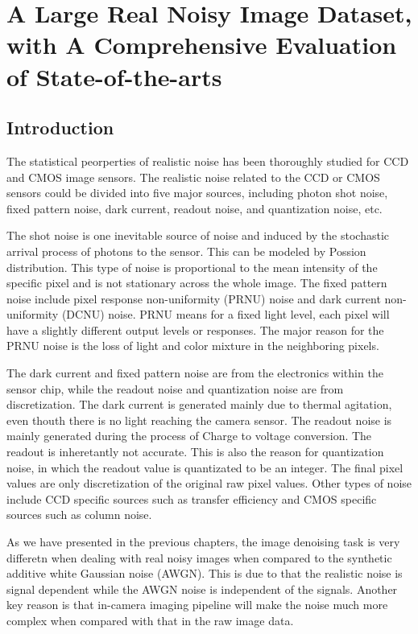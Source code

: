 %
\chapter{A Large Real Noisy Image Dataset, with A Comprehensive Evaluation of State-of-the-arts}
\label{sec:dataset}

\section{Introduction}

The statistical peorperties of realistic noise has been thoroughly studied for CCD and CMOS image sensors. The realistic noise related to the CCD or CMOS sensors could be divided into five major sources, including photon shot noise, fixed pattern noise, dark current, readout noise, and quantization noise, etc.

The shot noise is one inevitable source of noise and induced by the stochastic arrival process of photons to the sensor. This can be modeled by Possion distribution. This type of noise is proportional to the mean intensity of the specific pixel and is not stationary across the whole image. The fixed pattern noise include pixel response non-uniformity (PRNU) noise and dark current non-uniformity (DCNU) noise. PRNU means for a fixed light level, each pixel will have a slightly different output levels or responses. The major reason for the PRNU noise is the loss of light and color mixture in the neighboring pixels.

The dark current and fixed pattern noise are from the electronics within the sensor chip, while the readout noise and quantization noise are from discretization. The dark current is generated mainly  due to thermal agitation, even thouth there is no light reaching the camera sensor. The readout noise is mainly generated during the process of Charge to voltage conversion. The readout is inheretantly not accurate. This is also the reason for quantization noise, in which the readout value is quantizated to be an integer. The final pixel values are only discretization of the original raw pixel values. Other types of noise include CCD specific sources such as transfer efficiency and CMOS specific sources such as column noise.

As we have presented in the previous chapters, the image denoising task is very differetn when dealing with real noisy images when compared to the synthetic additive white Gaussian noise (AWGN). This is due to that the realistic noise is signal dependent while the AWGN noise is independent of the signals. Another key reason is that in-camera imaging pipeline will make the noise much more complex when compared with that in the raw image data.

